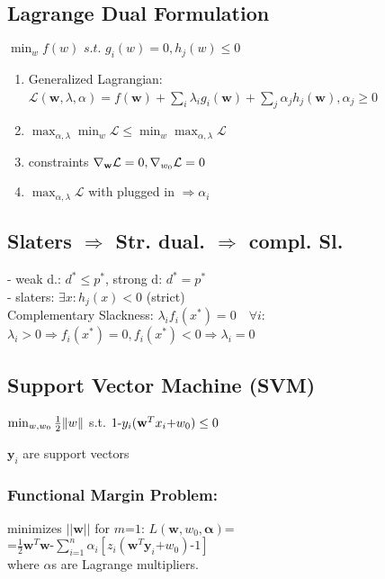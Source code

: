 \subsection{Lagrange Dual Formulation}
$\min_w f(w) \textit{ s.t. } g_i(w) = 0, h_j(w) \leq 0$\\
\begin{enumerate}
  \item  Generalized Lagrangian: $\mathcal L(\mathbf w, \lambda, \alpha) = f(\mathbf w) + \sum_i\lambda_ig_i(\mathbf w) + \sum_{j} \alpha_jh_j(\mathbf w), \alpha_j\geq 0$ \
  \item  $\max_{\alpha, \lambda} \min_w  \mathcal L\leq \min_w \max_{\alpha, \lambda} \mathcal L$
  \item constraints $\nabla_\mathbf w \mathcal L = 0, \nabla_{w_0} \mathcal L = 0$
  \item $\max_{\alpha, \lambda} \mathcal L$ with plugged in $\Rightarrow\alpha_i$
\end{enumerate}

\subsection{Slaters $\Rightarrow$ Str. dual. $\Rightarrow$ compl. Sl. }
- weak d.: $d^*\leq p^*$, strong d: $d^* = p^*$ \\
- slaters: $\exists x: h_j(x) < 0$ (strict) \\
Complementary Slackness: $\lambda_if_i(x^*) {=} 0 \quad \forall i: $
$ \lambda_i{>}0 \Rightarrow f_i(x^*) {=} 0, f_i(x^*) {<} 0 \Rightarrow \lambda_i {=} 0$
\subsection{Support Vector Machine (SVM)}
$\min_{w, w_0}\frac{1}{2}\|w\|$ s.t. $1\text{-} y_i(\mathbf w^Tx_i \text{+} w_0) \leq 0$


 $\mathbf{y}_i$ are support vectors
 
\subsubsection{Functional Margin Problem:}
minimizes $||\mathbf{w}||$ for $m{\text{=}}1$: 
$L(\mathbf{w}, w_0, \mathbf{\alpha}) {\text{=}}$\\
$\text{=}\frac{1}{2}\mathbf{w}^T\mathbf{w}{\text{-}}\sum_{i\text{=}1}^n\alpha_i[z_i(\mathbf{w}^T\mathbf{y}_i{}\text{+}w_0){\text{-}}1]$\\
where $\alpha$s are Lagrange multipliers.\\




